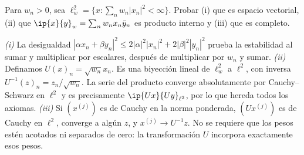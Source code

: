 \begin{ejercicio}\label{ej:lectura-29-7}
Para $w_n>0$, sea $\ell^{2}_w=\{x:\sum_n w_n|x_n|^{2}<\infty\}$. Probar (i) que es espacio vectorial, (ii) que $\ip{x}{y}_w=\sum_nw_nx_n\bar y_n$ es producto interno y (iii) que es completo.
\end{ejercicio}
\begin{solucion}
\emph{(i)} La desigualdad $|\alpha x_n+\beta y_n|^{2}\leq2|\alpha|^{2}|x_n|^{2}+2|\beta|^{2}|y_n|^{2}$ prueba la estabilidad al sumar y multiplicar por escalares, después de multiplicar por $w_n$ y sumar.
\emph{(ii)} Definamos $U(x)_n=\sqrt{w_n}x_n$. Es una biyección lineal de $\ell^{2}_w$ a $\ell^{2}$, con inversa $U^{-1}(z)_n=z_n/\sqrt{w_n}$. La serie del producto converge absolutamente por Cauchy--Schwarz en $\ell^{2}$ y es precisamente $\ip{Ux}{Uy}_{\ell^{2}}$, por lo que hereda todos los axiomas.
\emph{(iii)} Si $(x^{(j)})$ es de Cauchy en la norma ponderada, $(Ux^{(j)})$ es de Cauchy en $\ell^{2}$, converge a algún $z$, y $x^{(j)}\to U^{-1}z$. No se requiere que los pesos estén acotados ni separados de cero: la transformación $U$ incorpora exactamente esos pesos.
\end{solucion}

